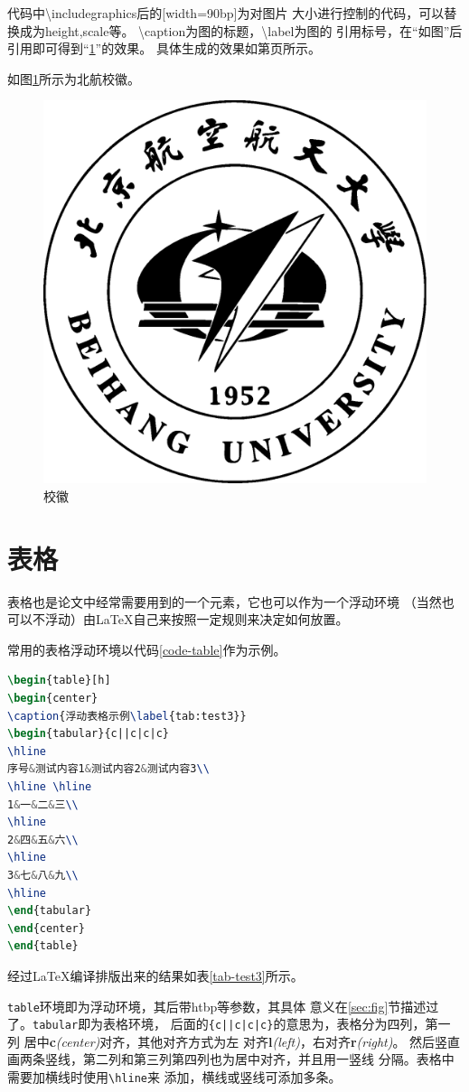 代码中\textbackslash includegraphics后的[width=90bp]为对图片
大小进行控制的代码，可以替换成为height,scale等。
\textbackslash caption为图的标题，\textbackslash label为图的
引用标号，在“如图”后引用即可得到“\ref{figbuaamark}”的效果。
具体生成的效果如第\pageref{figbuaamark}页所示。

如图\ref{figbuaamark}所示为北航校徽。

\begin{figure}[htb]
\begin{center}
\includegraphics[width=90bp]{figure/buaamark.eps}
\caption{校徽\label{figbuaamark}}
\end{center}
\end{figure}

\section{表格}
\label{sec-table}
表格也是论文中经常需要用到的一个元素，它也可以作为一个浮动环境
（当然也可以不浮动）由\LaTeX{}自己来按照一定规则来决定如何放置。

常用的表格浮动环境以代码\ref{code-table}作为示例。

\begin{lstlisting}[caption={表格浮动环境},label={code-table},language={LaTeX}]
\begin{table}[h]
\begin{center}
\caption{浮动表格示例\label{tab:test3}}
\begin{tabular}{c||c|c|c}
\hline
序号&测试内容1&测试内容2&测试内容3\\
\hline \hline
1&一&二&三\\
\hline
2&四&五&六\\
\hline
3&七&八&九\\
\hline
\end{tabular}
\end{center}
\end{table}
\end{lstlisting}

经过\LaTeX{}编译排版出来的结果如表\ref{tab-test3}所示。

\texttt{table}环境即为浮动环境，其后带htbp等参数，其具体
意义在\ref{sec:fig}节描述过了。\texttt{tabular}即为表格环境，
后面的\texttt{\{c||c|c|c\}}的意思为，表格分为四列，第一列
居中{\bf c}\textit{(center)}对齐，其他对齐方式为左
对齐{\bf l}\textit{(left)}，右对齐{\bf r}\textit{(right)}。
然后竖直画两条竖线，第二列和第三列第四列也为居中对齐，并且用一竖线
分隔。表格中需要加横线时使用\texttt{\textbackslash hline}来
添加，横线或竖线可添加多条。

